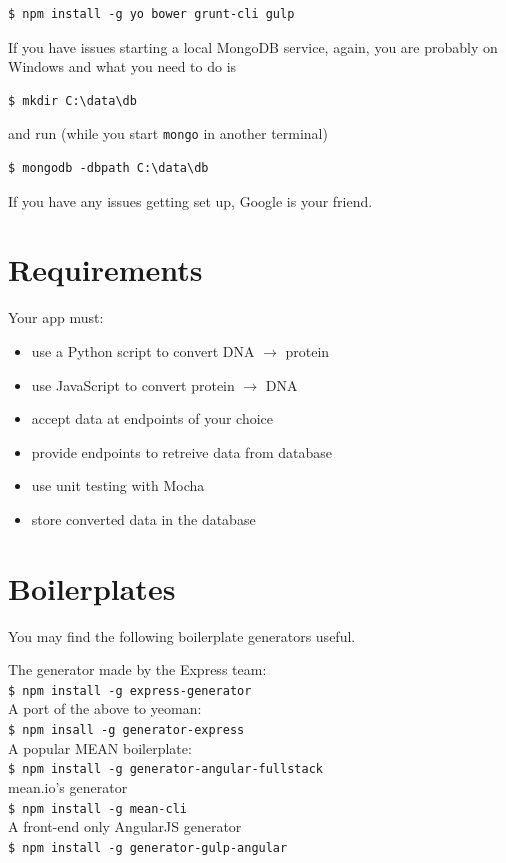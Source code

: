 \begin{verbatim}
$ npm install -g yo bower grunt-cli gulp
\end{verbatim}

If you have issues starting a local MongoDB service, again, you are probably on
Windows and what you need to do is 

\begin{verbatim}
$ mkdir C:\data\db    
\end{verbatim}

and run (while you start \texttt{mongo} in another terminal) 

\begin{verbatim}
$ mongodb -dbpath C:\data\db  
\end{verbatim}
If you have any issues getting set up, Google is your friend. 

\section{Requirements}

Your app must:
\begin{itemize}
    \item use a Python script to convert DNA $\rightarrow$ protein
    \item use JavaScript to convert protein $\rightarrow$ DNA
    \item accept data at endpoints of your choice
    \item provide endpoints to retreive data from database
    \item use unit testing with Mocha
    \item store converted data in the database 
\end{itemize}

\section{Boilerplates}

You may find the following boilerplate generators useful.

\noindent The generator made by the Express team: \\
\texttt{\$ npm install -g express-generator} \\ 
A port of the above to yeoman: \\
\texttt{\$ npm insall -g generator-express} \\
A popular MEAN boilerplate: \\
\texttt{\$ npm install -g generator-angular-fullstack} \\
mean.io's generator \\
\texttt{\$ npm install -g mean-cli} \\
A front-end only AngularJS generator \\
\texttt{\$ npm install -g generator-gulp-angular}

